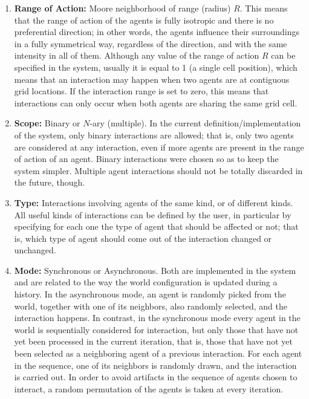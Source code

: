 \documentclass[11pt, a4paper]{article}
\begin{document}
\begin{enumerate}
\item \textbf{Range of Action:} Moore neighborhood of range (radius) $R$. This means that the range of action of the agents is fully isotropic and there is no preferential direction; in other words, the agents influence their surroundings in a fully symmetrical way, regardless of the direction, and with the same intensity in all of them. Although any value of the range of action $R$ can be specified in the system, usually it is equal to 1 (a single cell position), which means that an interaction may happen when two agents are at contiguous grid locations. If the interaction range is set to zero, this means that interactions can only occur when both agents are sharing the same grid cell.

\item \textbf{Scope:} Binary or $N$-ary (multiple). In the current definition/implementation of the system, only binary interactions are allowed; that is, only two agents are considered at any interaction, even if more agents are present in the range of action of an agent. Binary interactions were chosen so as to keep the system simpler. Multiple agent interactions should not be totally discarded in the future, though.

\item \textbf{Type:} Interactions involving agents of the same kind, or of different kinds. All useful kinds of interactions can be defined by the user, in particular by specifying for each one the type of agent that should be affected or not; that is, which type of agent should come out of the interaction changed or unchanged.

\item \textbf{Mode:} Synchronous or Asynchronous. Both are implemented in the system and are related to the way the world configuration is updated during a history. In the asynchronous mode, an agent is randomly picked from the world, together with one of its neighbors, also randomly selected, and the interaction happens. In contrast, in the synchronous mode every agent in the world is sequentially considered for interaction, but only those that have not yet been processed in the current iteration, that is, those that have not yet been selected as a neighboring agent of a previous interaction. For each agent in the sequence, one of its neighbors is randomly drawn, and the interaction is carried out. In order to avoid artifacts in the sequence of agents chosen to interact, a random permutation of the agents is taken at every iteration.


\end{enumerate}
\end{document}
